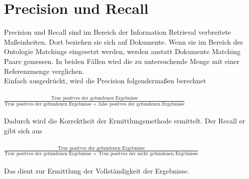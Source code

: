 	\section{Precision und Recall}
	Precision und Recall sind im Bereich der Information Retrieval verbreitete
	Maßeinheiten. Dort beziehen sie sich auf Dokumente.
	Wenn sie im Bereich des Ontologie Matchings eingesetzt werden, werden anstatt Dokumente Matching Paare
	gemessen. In beiden Fällen
	wird die zu untersuchende Menge mit einer Referenzmenge
	verglichen.\cite{Euz07}\\
	Einfach ausgedrückt, wird die Precision folgendermaßen
	berechnet\\\\
	\( \frac{\text{True positves der gefundenen Ergebnisse}}{\text{True
	positves der gefundenen Ergebnisse + false positves der gefundenen Ergebnisse}} \)
	\\\\
	Dadurch wird die Korrektheit der Ermittlungsmethode ermittelt\cite{Euz07}.
	Der Recall er gibt sich aus\\\\
	\( \frac{\text{True positves der gefundenen
	Ergebnisse}}{\text{True positves der gefundenen Ergebnisse + True positves der
	nicht gefundenen Ergebnisse}} \)
	\\\\
	Das dient zur Ermittlung der Vollständigkeit der Ergebnisse.\cite{Euz07}
	
	\cleardoublepage
	\pagebreak[4] 